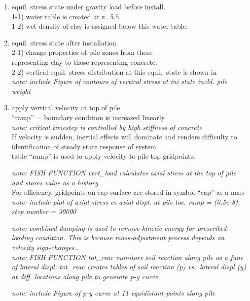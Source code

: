 \documentclass[a4paper, nobind]{templates/ociamthesis}
\begin{document}
\begin{enumerate}
\def\labelenumi{\arabic{enumi})}
\item
  equil. stress state under gravity load before install.\\
  1-1) water table is created at z=5.5\\
  1-2) wet density of clay is assigned below this water table.\\
\item
  equil. stress state after installation.\\
  2-1) change properties of pile zones from those\\
  representing clay to those representing concrete.\\
  2-2) vertical equil. stress distribution at this equil. state is
  shown in\\
  \emph{note: include Figure of contours of vertical stress at ini state
  incld. pile weight}\\
\item
  apply vertical velocity at top of pile\\
  ``ramp'' = boundary condition is increased linearly\\
  \emph{note: critical timestep is controlled by high stiffness of
  concrete}\\
  If velocity is sudden, inertial effects will dominate and renders
  difficulty to identification of steady state response of system\\
  table ``ramp'' is used to apply velocity to pile top gridpoints.

  \hfill\break
  \emph{note: FISH FUNCTION vert\_load calculates axial stress at the top of
  pile and stores value as a history}\\
  For efficiency, gridpoints on cap surface are stored in symbol ``cap''
  as a map\\
  \emph{note: include plot of axial stress vs axial displ. at pile toe.
  ramp = (0,5e-8), step number = 30000}

  \hfill\break
  \emph{note: combined damping is used to remove kinetic energy for
  prescribed loading condition. This is because mass-adjustment
  process depends on velocity sign-changes..}\\
  \emph{note: FISH FUNCTION tot\_reac monitors soil reaction along pile as a
  func of lateral displ. tot\_reac creates tables of soil reaction (p)
  vs.~lateral displ (y) at diff. locations along pile to generate p-y
  curve.}

  \hfill\break
  \emph{note: include Figure of p-y curve at 11 equidistant points along
  pile}\\
\end{enumerate}
\end{document}

